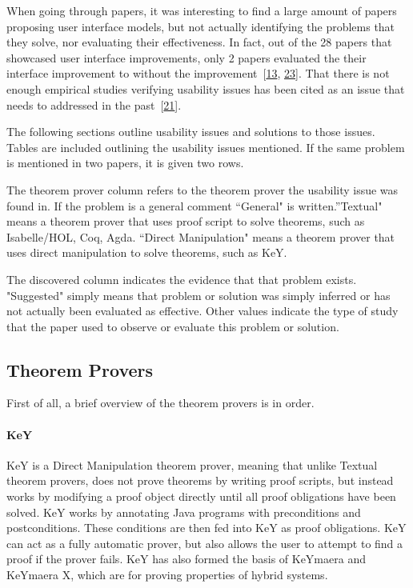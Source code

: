 \documentclass[
]{article}
\begin{document}
When going through papers, it was interesting to find a large amount of
papers proposing user interface models, but not actually identifying the
problems that they solve, nor evaluating their effectiveness. In fact,
out of the 28 papers that showcased user interface improvements, only 2
papers evaluated the their interface improvement to without the
improvement~{[}\protect\hyperlink{ref-berman_development_2014}{13},
\protect\hyperlink{ref-hentschel_empirical_2016}{23}{]}. That there is
not enough empirical studies verifying usability issues has been cited
as an issue that needs to addressed in the
past~{[}\protect\hyperlink{ref-hahnle_deductive_2019}{21}{]}.

The following sections outline usability issues and solutions to those
issues. Tables are included outlining the usability issues mentioned. If
the same problem is mentioned in two papers, it is given two rows.

The theorem prover column refers to the theorem prover the usability
issue was found in. If the problem is a general comment ``General" is
written.''Textual" means a theorem prover that uses proof script to
solve theorems, such as Isabelle/HOL, Coq, Agda. ``Direct Manipulation"
means a theorem prover that uses direct manipulation to solve theorems,
such as KeY.

The discovered column indicates the evidence that that problem exists.
"Suggested" simply means that problem or solution was simply inferred or
has not actually been evaluated as effective. Other values indicate the
type of study that the paper used to observe or evaluate this problem or
solution.

\hypertarget{theorem-provers}{%
\subsection{Theorem Provers}\label{theorem-provers}}

First of all, a brief overview of the theorem provers is in order.

\hypertarget{key}{%
\paragraph{KeY}\label{key}}

KeY is a Direct Manipulation theorem prover, meaning that unlike Textual
theorem provers, does not prove theorems by writing proof scripts, but
instead works by modifying a proof object directly until all proof
obligations have been solved. KeY works by annotating Java programs with
preconditions and postconditions. These conditions are then fed into KeY
as proof obligations. KeY can act as a fully automatic prover, but also
allows the user to attempt to find a proof if the prover fails. KeY has
also formed the basis of KeYmaera and KeYmaera X, which are for proving
properties of hybrid systems.
\end{document}
